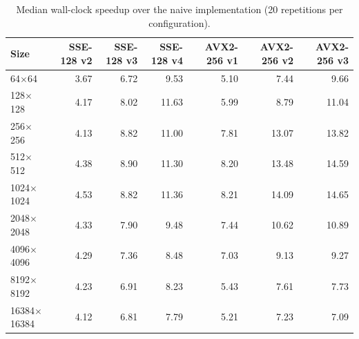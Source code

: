\begin{table}[htbp]
\centering
\small
\caption{Median wall-clock speedup over the naive implementation (20 repetitions per configuration).}
\label{tab:simd-speedup}
\begin{tabular}{lrrrrrr}
\toprule
Size & SSE-128 v2 & SSE-128 v3 & SSE-128 v4 & AVX2-256 v1 & AVX2-256 v2 & AVX2-256 v3 \\
\midrule
64$\times$64 & 3.67 & 6.72 & 9.53 & 5.10 & 7.44 & 9.66 \\
128$\times$128 & 4.17 & 8.02 & 11.63 & 5.99 & 8.79 & 11.04 \\
256$\times$256 & 4.13 & 8.82 & 11.00 & 7.81 & 13.07 & 13.82 \\
512$\times$512 & 4.38 & 8.90 & 11.30 & 8.20 & 13.48 & 14.59 \\
1024$\times$1024 & 4.53 & 8.82 & 11.36 & 8.21 & 14.09 & 14.65 \\
2048$\times$2048 & 4.33 & 7.90 & 9.48 & 7.44 & 10.62 & 10.89 \\
4096$\times$4096 & 4.29 & 7.36 & 8.48 & 7.03 & 9.13 & 9.27 \\
8192$\times$8192 & 4.23 & 6.91 & 8.23 & 5.43 & 7.61 & 7.73 \\
16384$\times$16384 & 4.12 & 6.81 & 7.79 & 5.21 & 7.23 & 7.09 \\
\bottomrule
\end{tabular}
\end{table}
